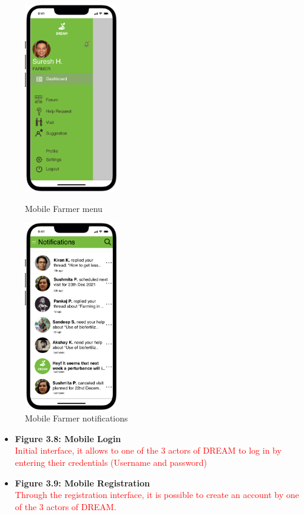 \begin{figure}[H]
  \centering
   \begin{minipage}{0.4\textwidth}
     \includegraphics[width=40mm,scale=0.9]{./Images//Mocks/Mobile/Farmer_menu.png}
     \caption{Mobile Farmer menu}
   \end{minipage}
    \hfill
   \begin{minipage}{0.4\textwidth}
     \includegraphics[width=40mm,scale=0.9]{./Images//Mocks/Mobile/Farmer_notif.png}
     \caption{Mobile Farmer notifications}
   \end{minipage}
\end{figure}
\newpage
\begin{itemize}
    \item \textbf{Figure 3.8: Mobile Login}\\ 
    \textcolor{red}{Initial interface, it allows to one of the 3 actors of DREAM to log in by entering their credentials (Username and password)}
\end{itemize}
\begin{itemize}
    \item \textbf{Figure 3.9: Mobile Registration}\\ 
    \textcolor{red}{Through the registration interface, it is possible to create an account by  one of the 3 actors of DREAM.}
\end{itemize}

